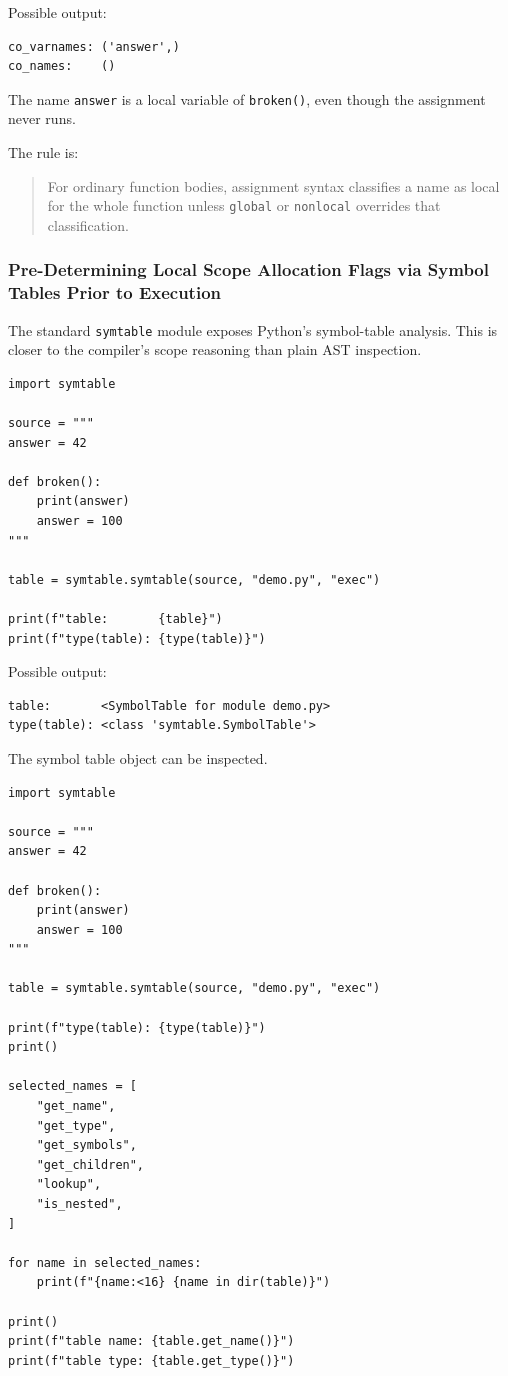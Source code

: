 Possible output:

\begin{verbatim}
co_varnames: ('answer',)
co_names:    ()
\end{verbatim}

The name \texttt{answer} is a local variable of \texttt{broken()}, even though the assignment never runs.

The rule is:

\begin{quote}
For ordinary function bodies, assignment syntax classifies a name as local for the whole function unless \texttt{global} or \texttt{nonlocal} overrides that classification.
\end{quote}

\subsubsection{Pre-Determining Local Scope Allocation Flags via Symbol Tables Prior to Execution}

The standard \texttt{symtable} module exposes Python's symbol-table analysis. This is closer to the compiler's scope reasoning than plain AST inspection.

\begin{verbatim}
import symtable

source = """
answer = 42

def broken():
    print(answer)
    answer = 100
"""

table = symtable.symtable(source, "demo.py", "exec")

print(f"table:       {table}")
print(f"type(table): {type(table)}")
\end{verbatim}

Possible output:

\begin{verbatim}
table:       <SymbolTable for module demo.py>
type(table): <class 'symtable.SymbolTable'>
\end{verbatim}

The symbol table object can be inspected.

\begin{verbatim}
import symtable

source = """
answer = 42

def broken():
    print(answer)
    answer = 100
"""

table = symtable.symtable(source, "demo.py", "exec")

print(f"type(table): {type(table)}")
print()

selected_names = [
    "get_name",
    "get_type",
    "get_symbols",
    "get_children",
    "lookup",
    "is_nested",
]

for name in selected_names:
    print(f"{name:<16} {name in dir(table)}")

print()
print(f"table name: {table.get_name()}")
print(f"table type: {table.get_type()}")
\end{verbatim}

